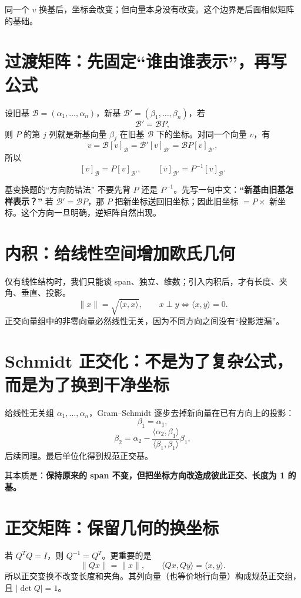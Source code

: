 \documentclass[11pt,a4paper,openany]{ctexbook}
\newcommand{\key}[1]{\textbf{\color{deep}#1}}
\begin{document}
同一个 $v$ 换基后，坐标会改变；但向量本身没有改变。这个边界是后面相似矩阵的基础。

\section{过渡矩阵：先固定“谁由谁表示”，再写公式}
设旧基 $\mathcal B=(\alpha_1,\dots,\alpha_n)$，新基 $\mathcal B'=(\beta_1,\dots,\beta_n)$，若
\[
\mathcal B'=\mathcal BP,
\]
则 $P$ 的第 $j$ 列就是新基向量 $\beta_j$ 在旧基 $\mathcal B$ 下的坐标。对同一个向量 $v$，有
\[
v=\mathcal B[v]_{\mathcal B}=\mathcal B'[v]_{\mathcal B'}=\mathcal BP[v]_{\mathcal B'},
\]
所以
\[
\boxed{[v]_{\mathcal B}=P[v]_{\mathcal B'},\qquad [v]_{\mathcal B'}=P^{-1}[v]_{\mathcal B}.}
\]

\begin{methodbox}{基变换题的“方向防错法”}
不要先背 $P$ 还是 $P^{-1}$。先写一句中文：\key{“新基由旧基怎样表示？”} 若 $\mathcal B'=\mathcal BP$，那 $P$ 把新坐标送回旧坐标；因此旧坐标 $=P\times$ 新坐标。这个方向一旦明确，逆矩阵自然出现。
\end{methodbox}

\section{内积：给线性空间增加欧氏几何}
仅有线性结构时，我们只能谈 span、独立、维数；引入内积后，才有长度、夹角、垂直、投影。
\[
\|x\|=\sqrt{\langle x,x\rangle},\qquad x\perp y\iff \langle x,y\rangle=0.
\]
正交向量组中的非零向量必然线性无关，因为不同方向之间没有“投影泄漏”。

\section{Schmidt 正交化：不是为了复杂公式，而是为了换到干净坐标}
给线性无关组 $\alpha_1,\dots,\alpha_n$，Gram--Schmidt 逐步去掉新向量在已有方向上的投影：
\[
\beta_1=\alpha_1,
\]
\[
\beta_2=\alpha_2-\frac{\langle\alpha_2,\beta_1\rangle}{\langle\beta_1,\beta_1\rangle}\beta_1,
\]
后续同理。最后单位化得到规范正交基。

其本质是：\key{保持原来的 span 不变，但把坐标方向改造成彼此正交、长度为 1 的基。}

\section{正交矩阵：保留几何的换坐标}
若 $Q^TQ=I$，则 $Q^{-1}=Q^T$。更重要的是
\[
\|Qx\|=\|x\|,\qquad \langle Qx,Qy\rangle=\langle x,y\rangle.
\]
所以正交变换不改变长度和夹角。其列向量（也等价地行向量）构成规范正交组，且 $|\det Q|=1$。
\end{document}
